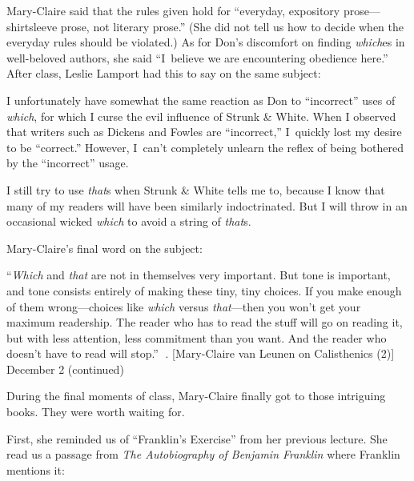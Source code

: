 Mary-Claire said that the rules given hold for ``everyday, expository
prose---shirtsleeve prose, not literary prose.''  (She did not tell us how
to decide when the everyday rules should be violated.)  As for Don's
discomfort on finding {\it which\/}es in 
well-beloved authors, she said ``I~believe we
are encountering obedience here.''  After class, Leslie Lamport had this to
say on the same subject:

{\narrower\smallskip\noindent
    I unfortunately have somewhat the same reaction as Don to ``incorrect''
    uses of {\it which}, for which I curse the evil influence of Strunk
\&  White.  When I observed that writers such as Dickens and Fowles
    are ``incorrect,'' I~quickly lost my desire to be ``correct.''  However,
    I~can't completely unlearn the reflex of being bothered by the
    ``incorrect'' usage.

    I still try to use {\it that\/}s  when Strunk \&  White tells me to,
    because I know that many of my readers will have been similarly
    indoctrinated.  But I will throw in an occasional wicked {\it which\/}
    to avoid a string of {\it that\/}s.
\smallskip}

Mary-Claire's final word on the subject: 

{\narrower\smallskip\noindent
``{\it Which\/} and {\it that\/} are not in themselves very important.  But tone
    is important, and tone consists entirely of making these tiny, tiny
    choices.  If you make enough of them wrong---choices like {\it which\/}
    versus {\it that\/}---then you won't get your maximum readership.  The
    reader who has to read the stuff will go on reading it, but with less
    attention, less commitment than you want.  And the reader who doesn't
    have to read will stop.''
\smallskip}
. [Mary-Claire van Leunen on Calisthenics (2)] \tll December {2 (continued)}

During the final moments of class, Mary-Claire finally got to those
intriguing books.  They were worth waiting for.

First, she reminded us of ``Franklin's Exercise'' from her previous lecture.
She read us a passage from {\sl The Autobiography of Benjamin Franklin\/} where
Franklin mentions it:

